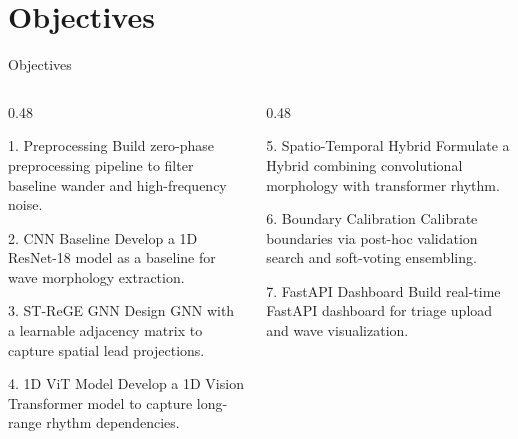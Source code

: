 \documentclass[11pt,aspectratio=169]{beamer}
\begin{document}
\section{Objectives}
\begin{frame}{Objectives}
    \begin{columns}[T]
        \begin{column}{0.48\textwidth}
            \begin{block}{\small 1. Preprocessing}
                \fontsize{8}{9.5}\selectfont Build zero-phase preprocessing pipeline to filter baseline wander and high-frequency noise.
            \end{block}
            \vspace{0.1cm}
            \begin{block}{\small 2. CNN Baseline}
                \fontsize{8}{9.5}\selectfont Develop a 1D ResNet-18 model as a baseline for wave morphology extraction.
            \end{block}
            \vspace{0.1cm}
            \begin{block}{\small 3. ST-ReGE GNN}
                \fontsize{8}{9.5}\selectfont Design GNN with a learnable adjacency matrix to capture spatial lead projections.
            \end{block}
            \vspace{0.1cm}
            \begin{block}{\small 4. 1D ViT Model}
                \fontsize{8}{9.5}\selectfont Develop a 1D Vision Transformer model to capture long-range rhythm dependencies.
            \end{block}
        \end{column}
        \begin{column}{0.48\textwidth}
            \begin{block}{\small 5. Spatio-Temporal Hybrid}
                \fontsize{8}{9.5}\selectfont Formulate a Hybrid combining convolutional morphology with transformer rhythm.
            \end{block}
            \vspace{0.18cm}
            \begin{block}{\small 6. Boundary Calibration}
                \fontsize{8}{9.5}\selectfont Calibrate boundaries via post-hoc validation search and soft-voting ensembling.
            \end{block}
            \vspace{0.18cm}
            \begin{block}{\small 7. FastAPI Dashboard}
                \fontsize{8}{9.5}\selectfont Build real-time FastAPI dashboard for triage upload and wave visualization.
            \end{block}
        \end{column}
    \end{columns}
\end{frame}
\end{document}
